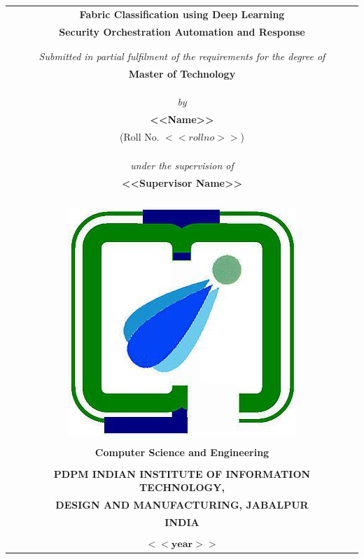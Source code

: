 
\begin{titlepage}
\thispagestyle{empty}


\begin{table}
	\centering
	\begin{tabular}{c}
		\Large \textbf{Fabric Classification using Deep Learning} \\
        \Large \textbf{Security Orchestration Automation and Response} \\
		\\
		\\
		\it Submitted in partial fulfilment of the requirements for the degree of	\\
		\bf Master of Technology	\\
		\\
		\\
		\\
		\it by	\\
		\large \bf {<<Name>>}	\\
		(Roll No. $<<roll no>>$)	\\
		\\
		\\
		\\
		\it under the supervision of	\\
		\large \bf <<Supervisor Name>>	\\

		\\
		\\
		\\
		\\
		\includegraphics[width=.17\textwidth]{images/iiitdmj.png}	\\
		\\
		\normalsize{\textbf{Computer Science and Engineering}}	\\
		\\
		\bf PDPM INDIAN INSTITUTE OF INFORMATION TECHNOLOGY,	\\
		\bf DESIGN AND MANUFACTURING, JABALPUR	\\
		\bf INDIA	\\
		\\
		$\mathbf{<<year>>}$	\\
	\end{tabular}
\end{table}
\pagebreak


\thispagestyle{empty}
\end{titlepage}

